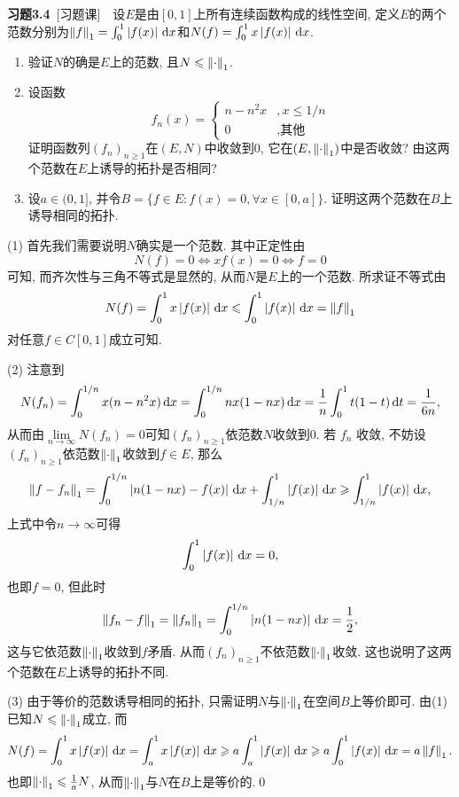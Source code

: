 	\textbf{习题3.4}\ [习题课]\ \ 设$ E $是由$ [0,1] $上所有连续函数构成的线性空间, 定义$ E $的两个范数分别为$ \left\| f \right\|_1=\int_0^1\left| f(x) \right| \,\mathrm{d} x $和$ N(f)=\int_0^1x\left| f(x) \right| \,\mathrm{d} x $.
	\begin{enumerate}[(1)]
	\item 验证$ N $的确是$ E $上的范数, 且$ N\leqslant\left\| \cdot \right\|_1 $.
	\item 设函数
	\[
	f_n(x)=\begin{cases}
	n-n^2x & ,x\leqslant 1/n\\
	0 & ,\text{其他}
	\end{cases}
	\]
	证明函数列$ (f_n)_{n\geqslant 1} $在$ (E,N) $中收敛到0, 它在$ (E,\left\| \cdot \right\|_1) $中是否收敛? 由这两个范数在$ E $上诱导的拓扑是否相同?
	\item 设$ a\in(0,1] $, 并令$ B=\{ f\in E : f(x)=0, \forall x\in[0,a] \} $. 证明这两个范数在$ B $上诱导相同的拓扑.
	\end{enumerate}
	
	\begin{Proof}
	(1) 首先我们需要说明$ N $确实是一个范数. 其中正定性由
	\[
	N(f)=0\Longleftrightarrow xf(x)=0\Longleftrightarrow f=0
	\]
	可知, 而齐次性与三角不等式是显然的, 从而$ N $是$ E $上的一个范数. 所求证不等式由
	\[
	N(f)=\int_0^1x\left| f(x) \right| \,\mathrm{d} x\leqslant\int_0^1\left| f(x) \right| \,\mathrm{d} x=\left\| f \right\|_1
	\]
	对任意$ f\in C[0,1] $成立可知.
	
	(2) 注意到
	\[
	N(f_n)=\int_0^{1/n}x(n-n^2x)\,\mathrm{d} x=\int_0^{1/n}nx(1-nx)\,\mathrm{d} x=\frac{1}{n}\int_0^1t(1-t)\,\mathrm{d} t=\frac{1}{6n},
	\]
	从而由$ \lim\limits_{n\to\infty}N(f_n)=0 $可知$ (f_n)_{n\geqslant 1} $依范数$ N $收敛到0. 若 $ f_{n} $ 收敛, 不妨设$ (f_n)_{n\geqslant 1} $依范数$ \left\| \cdot \right\|_1 $收敛到$ f\in E $, 那么
	\[
	\left\| f-f_n \right\|_1=\int_0^{1/n}\left| n(1-nx)-f(x) \right| \,\mathrm{d} x+\int_{1/n}^1\left| f(x) \right| \,\mathrm{d} x\geqslant\int_{1/n}^1\left| f(x) \right| \,\mathrm{d} x,
	\]
	上式中令$ n\to\infty $可得
	\[
	\int_0^1\left| f(x) \right| \,\mathrm{d} x=0,
	\]
	也即$ f=0 $, 但此时
	\[
	\left\| f_n-f \right\|_1=\left\| f_n \right\|_{1}=\int_0^{1/n}\left| n(1-nx) \right| \,\mathrm{d} x=\frac{1}{2},
	\]
	这与它依范数$ \left\| \cdot \right\|_1 $收敛到$ f $矛盾. 从而$ (f_n)_{n\geqslant 1} $不依范数$ \left\| \cdot \right\|_1 $收敛. 这也说明了这两个范数在$ E $上诱导的拓扑不同.
	
	(3) 由于等价的范数诱导相同的拓扑, 只需证明$ N $与$ \left\| \cdot \right\|_1 $在空间$ B $上等价即可. 由(1)已知$ N\leqslant\left\| \cdot \right\|_1 $成立, 而
	\[
	N(f)=\int_0^1x\left| f(x) \right| \,\mathrm{d} x=\int_a^1x\left| f(x) \right| \,\mathrm{d} x\geqslant a\int_a^1\left| f(x) \right| \,\mathrm{d} x\geqslant a\int_0^1\left| f(x) \right| \,\mathrm{d} x=a\left\| f \right\|_1.
	\]
	也即$ \left\| \cdot \right\|_1\leqslant\frac{1}{a}N $, 从而$ \left\| \cdot \right\|_1 $与$ N $在$ B $上是等价的.\qed
	\end{Proof}

